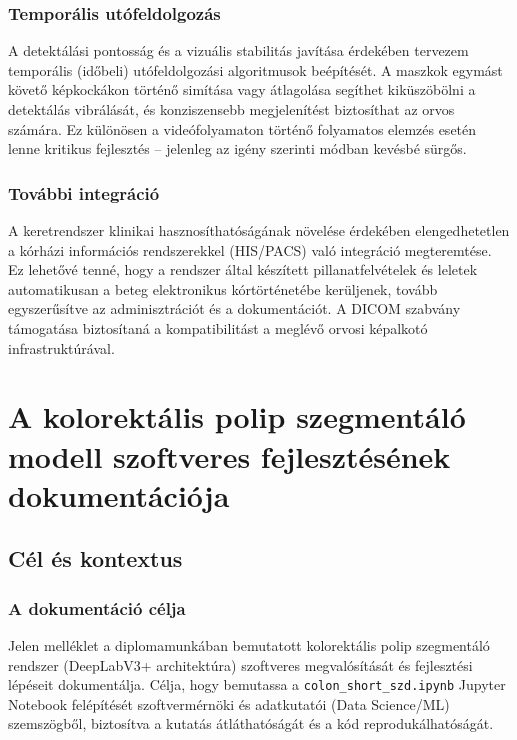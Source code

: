 \documentclass[12pt, a4paper]{report}
\begin{document}
\subsection{Temporális utófeldolgozás}
A detektálási pontosság és a vizuális stabilitás javítása érdekében tervezem temporális (időbeli) utófeldolgozási algoritmusok beépítését. A maszkok egymást követő képkockákon történő simítása vagy átlagolása segíthet kiküszöbölni a detektálás vibrálását, és konziszensebb megjelenítést biztosíthat az orvos számára. Ez különösen a videófolyamaton történő folyamatos elemzés esetén lenne kritikus fejlesztés – jelenleg az igény szerinti módban kevésbé sürgős.

\subsection{További integráció}
A keretrendszer klinikai hasznosíthatóságának növelése érdekében elengedhetetlen a kórházi információs rendszerekkel (HIS/PACS) való integráció megteremtése. Ez lehetővé tenné, hogy a rendszer által készített pillanatfelvételek és leletek automatikusan a beteg elektronikus kórtörténetébe kerüljenek, tovább egyszerűsítve az adminisztrációt és a dokumentációt. A DICOM szabvány támogatása biztosítaná a kompatibilitást a meglévő orvosi képalkotó infrastruktúrával.

\printbibliography

\appendix

\chapter{A kolorektális polip szegmentáló modell szoftveres fejlesztésének dokumentációja}

\section{Cél és kontextus}

\subsection{A dokumentáció célja}
Jelen melléklet a diplomamunkában bemutatott kolorektális polip szegmentáló rendszer (DeepLabV3+ architektúra) szoftveres megvalósítását és fejlesztési lépéseit dokumentálja. Célja, hogy bemutassa a \texttt{colon\_short\_szd.ipynb} Jupyter Notebook felépítését szoftvermérnöki és adatkutatói (Data Science/ML) szemszögből, biztosítva a kutatás átláthatóságát és a kód reprodukálhatóságát.
\end{document}

